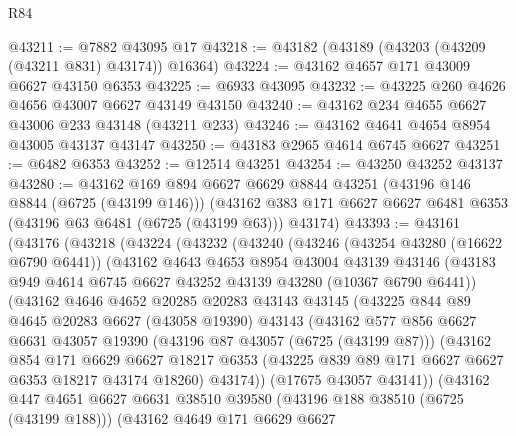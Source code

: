 \begin{lexlean}{R84}
\begin{coremodule}
@43211 := @7882 @43095 @17
@43218 := @43182 (@43189 (@43203 (@43209 (@43211 @831) @43174)) @16364)
@43224 := @43162 @4657 @171 @43009 @6627 @43150 @6353
@43225 := @6933 @43095
@43232 := @43225 @260 @4626 @4656 @43007 @6627 @43149 @43150
@43240 := @43162 @234 @4655 @6627 @43006 @233 @43148 (@43211 @233)
@43246 := @43162 @4641 @4654 @8954 @43005 @43137 @43147
@43250 := @43183 @2965 @4614 @6745 @6627
@43251 := @6482 @6353
@43252 := @12514 @43251
@43254 := @43250 @43252 @43137
@43280 := @43162
    @169
    @894
    @6627
    @6629
    @8844
    @43251
    (@43196 @146 @8844 (@6725 (@43199 @146)))
    (@43162 @383 @171 @6627 @6627 @6481 @6353 (@43196 @63 @6481 (@6725 (@43199 @63))) @43174)
@43393 := @43161
    (@43176
      (@43218
        (@43224
          (@43232
            (@43240
              (@43246
                (@43254 @43280 (@16622 @6790 @6441))
                (@43162
                  @4643
                  @4653
                  @8954
                  @43004
                  @43139
                  @43146
                  (@43183 @949 @4614 @6745 @6627 @43252 @43139 @43280 (@10367 @6790 @6441))
                  (@43162
                    @4646
                    @4652
                    @20285
                    @20283
                    @43143
                    @43145
                    (@43225
                      @844
                      @89
                      @4645
                      @20283
                      @6627
                      (@43058 @19390)
                      @43143
                      (@43162
                        @577
                        @856
                        @6627
                        @6631
                        @43057
                        @19390
                        (@43196 @87 @43057 (@6725 (@43199 @87)))
                        (@43162
                          @854
                          @171
                          @6629
                          @6627
                          @18217
                          @6353
                          (@43225 @839 @89 @171 @6627 @6627 @6353 @18217 @43174 @18260)
                          @43174))
                      (@17675 @43057 @43141))
                    (@43162
                      @447
                      @4651
                      @6627
                      @6631
                      @38510
                      @39580
                      (@43196 @188 @38510 (@6725 (@43199 @188)))
                      (@43162
                        @4649
                        @171
                        @6629
                        @6627

\end{coremodule}
\end{lexlean}
